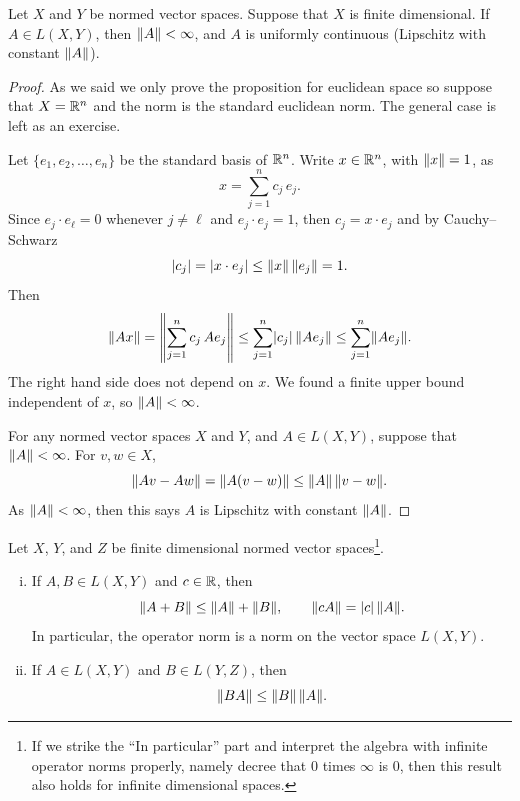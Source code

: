 \begin{prop} \label{prop:finitedimpropnormfin}
Let $X$ and $Y$ be normed vector spaces.
Suppose that $X$ is finite dimensional.
If $A \in L(X,Y)$, then $\lVert {A} \rVert < \infty$, and
$A$ is uniformly continuous (Lipschitz with constant $\lVert {A} \rVert$).
\end{prop}

\begin{proof}
As we said we only prove the proposition for euclidean space so suppose
that $X = {\mathbb{R}}^n$ and the norm is the standard euclidean norm.
The general case is left as an exercise.

Let $\{ e_1,e_2,\ldots,e_n \}$ be the standard basis of ${\mathbb{R}}^n$.
Write $x \in {\mathbb{R}}^n$, with $\lVert {x} \rVert = 1$, as
\begin{equation*}
x = \sum_{j=1}^n c_j \, e_j .
\end{equation*}
Since $e_j \cdot e_\ell = 0$ whenever $j\not=\ell$ and $e_j \cdot e_j = 1$,
then $c_j = x \cdot e_j$ and by Cauchy--Schwarz
\begin{equation*}
\lvert {c_j} \rvert = \lvert { x \cdot e_j } \rvert
\leq \lVert {x} \rVert \, \lVert {e_j} \rVert = 1 .
\end{equation*}
Then
\begin{equation*}
\lVert {Ax} \rVert =
\left\lVert {\sum_{j=1}^n c_j \, Ae_j} \right\rVert
\leq
\sum_{j=1}^n \lvert {c_j} \rvert \, \lVert {Ae_j} \rVert 
\leq
\sum_{j=1}^n \lVert {Ae_j} \rVert .
\end{equation*}
The right hand side does not depend on $x$.  We found
a finite upper bound independent of $x$, so $\lVert {A} \rVert < \infty$.

For any normed vector spaces $X$ and $Y$, and $A \in L(X,Y)$, suppose that
$\lVert {A} \rVert < \infty$.
For $v,w \in X$,
\begin{equation*}
\lVert {Av - Aw} \rVert =
\lVert {A(v-w)} \rVert \leq \lVert {A} \rVert \, \lVert {v-w} \rVert .
\end{equation*}
As $\lVert {A} \rVert < \infty$, then this says $A$ is Lipschitz with constant $\lVert {A} \rVert$.
\end{proof}

\begin{prop} \label{prop:finitedimpropnorm}
Let $X$, $Y$, and $Z$ be finite dimensional normed vector
spaces\footnote{If we strike the ``In particular'' part and interpret the
algebra with infinite operator norms properly, namely decree that $0$ times
$\infty$ is 0, then this result also holds for infinite
dimensional spaces.}.
{\ }
\begin{enumerate}[(i)]
\item \label{item:finitedimpropnorm:i}
If $A,B \in L(X,Y)$ and $c \in {\mathbb{R}}$, then
\begin{equation*}
\lVert {A+B} \rVert \leq \lVert {A} \rVert+\lVert {B} \rVert, \qquad \lVert {cA} \rVert = \lvert {c} \rvert \, \lVert {A} \rVert .
\end{equation*}
In particular, the operator norm is a norm on the vector space $L(X,Y)$.
\item \label{item:finitedimpropnorm:ii}
If $A \in L(X,Y)$ and $B \in L(Y,Z)$, then
\begin{equation*}
\lVert {BA} \rVert \leq \lVert {B} \rVert \, \lVert {A} \rVert .
\end{equation*}
\end{enumerate}
\end{prop}

